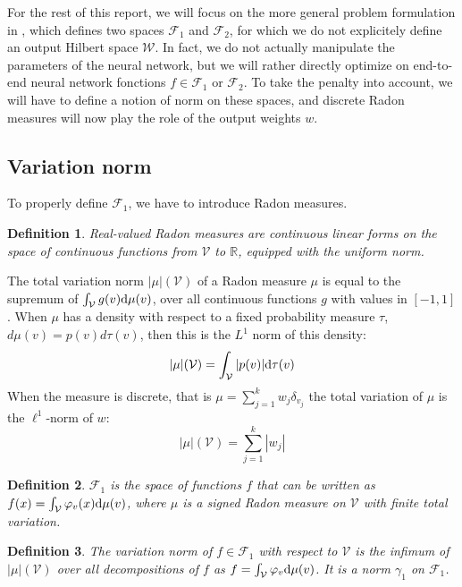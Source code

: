 \documentclass[a4paper, 11pt]{scrartcl}
\newtheorem{definition}{Definition}[section]
\begin{document}
{For the rest of this report, we will focus on the more general problem formulation in \cite{bach2017breaking}, which defines two spaces $\mathcal{F}_1$ and $\mathcal{F}_2$, for which we do not explicitely define an output Hilbert space $\mathcal{W}$. In fact, we do not actually manipulate the parameters of the neural network, but we will rather directly optimize on end-to-end neural network fonctions $f \in \mathcal{F}_1$ or $\mathcal{F}_2$. To take the penalty into account, we will have to define a notion of norm on these spaces, and discrete Radon measures will now play the role of the output weights $w$.

\subsection{Variation norm}

To properly define $\mathcal{F}_1$, we have to introduce Radon measures.

\begin{definition}
Real-valued Radon measures are continuous linear forms on the space of continuous functions from $\mathcal{V}$ to $\mathbb{R}$, equipped with the uniform norm.
\end{definition}

The total variation norm $|\mu|(\mathcal{V})$ of a Radon measure $\mu$  is equal to the supremum of $\int_\mathcal{V} g(v)\textnormal{d}\mu(v)$, over all continuous functions $g$ with values in $[-1, 1]$. When $\mu$ has a density with respect to a fixed probability measure $\tau$, ${d}\mu(v) = p(v) {d}\tau(v)$, then this is the $L^1$ norm of this density: $$|\mu|(\mathcal{V}) = \int_\mathcal{V} |p(v)| \textnormal{d}\tau(v)$$
When the measure is discrete, that is $\mu = \sum_{j=1}^k w_j \delta_{v_j}$ the total variation of $\mu$ is the $\ell^1$-norm of $w$:
$$|\mu|(\mathcal{V}) = \sum_{j=1}^k |w_j|  $$

\begin{definition}
$\mathcal{F}_1$ is the space of functions $f$ that can be written as
$f(x)= \int_\mathcal{V} \varphi_v(x)\textnormal{d}\mu(v)$,
where $\mu$ is a signed Radon measure on $\mathcal{V}$ with finite total variation.
\end{definition}

\begin{definition}
The variation norm of $f \in \mathcal{F}_1$ with respect to $\mathcal{V}$ is the infimum of $|\mu|(\mathcal{V})$ over all decompositions of $f$ as $f= \int_\mathcal{V} \varphi_v\textnormal{d}\mu(v)$. It is a norm $\gamma_1$ on $\mathcal{F}_1$.
\end{definition}

}
\end{document}
